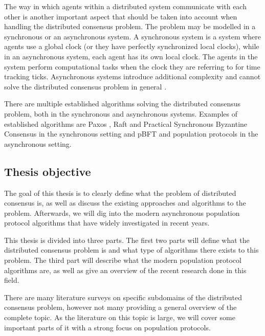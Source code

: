 The way in which agents within a distributed system communicate with each other is another important aspect that should be taken into account when handling the distributed consensus problem. The problem may be modelled in a synchronous or an asynchronous system. A synchronous system is a system where agents use a global clock (or they have perfectly synchronized local clocks), while in an asynchronous system, each agent has its own local clock. The agents in the system perform computational tasks when the clock they are referring to for time tracking ticks. Asynchronous systems introduce additional complexity and cannot solve the distributed consensus problem in general \cite{fischerImpossibilityDistributedConsensus}.

There are multiple established algorithms solving the distributed consensus problem, both in the synchronous and asynchronous systems. Examples of established algorithms are Paxos \cite{lamportFastPaxos2006}, Raft \cite{ongaroSearchUnderstandableConsensus} and Practical Synchronous Byzantine Consensus \cite{renPracticalSynchronousByzantine} in the synchronous setting and pBFT \cite{castroPracticalByzantineFault} and population protocols \cite{aspnesIntroductionPopulationProtocols2009} in the asynchronous setting.


\clearpage

\subsection{Thesis objective}
The goal of this thesis is to clearly define what the problem of distributed consensus is, as well as discuss the existing approaches and algorithms to the problem. Afterwards, we will dig into the modern asynchronous population protocol algorithms that have widely investigated in recent years. 

This thesis is divided into three parts. The first two parts will define what the distributed consensus problem is and what type of algorithms there exists to this problem. The third part will describe what the modern population protocol algorithms are, as well as give an overview of the recent research done in this field.

There are many literature surveys on specific subdomains of the distributed consensus problem, however not many providing a general overview of the complete topic. As the literature on this topic is large, we will cover some important parts of it with a strong focus on population protocols.



\clearpage
